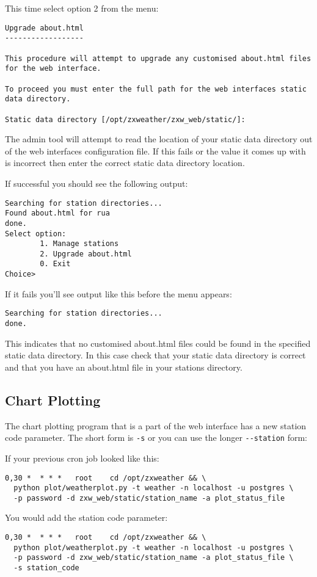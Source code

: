 \documentclass[a4paper,10pt,draft]{book}
\begin{document}
This time select option 2 from the menu:
\begin{verbatim}
Upgrade about.html
------------------

This procedure will attempt to upgrade any customised about.html files 
for the web interface.

To proceed you must enter the full path for the web interfaces static 
data directory.

Static data directory [/opt/zxweather/zxw_web/static/]:
\end{verbatim}

The admin tool will attempt to read the location of your static data directory out of the web interfaces configuration file. If this fails or the value it comes up with is incorrect then enter the correct static data directory location.

If successful you should see the following output:
\begin{verbatim}
Searching for station directories...
Found about.html for rua
done.
Select option:
        1. Manage stations
        2. Upgrade about.html
        0. Exit
Choice>
\end{verbatim}

If it fails you'll see output like this before the menu appears:
\begin{verbatim}
Searching for station directories...
done.
\end{verbatim}
This indicates that no customised about.html files could be found in the specified static data directory. In this case check that your static data directory is correct and that you have an about.html file in your stations directory.

\subsection{Chart Plotting}
The chart plotting program that is a part of the web interface has a new station code parameter. The short form is \verb|-s| or you can use the longer \verb|--station| form:

If your previous cron job looked like this:
\begin{verbatim}
0,30 *  * * *   root    cd /opt/zxweather && \
  python plot/weatherplot.py -t weather -n localhost -u postgres \
  -p password -d zxw_web/static/station_name -a plot_status_file
\end{verbatim}

You would add the station code parameter:
\begin{verbatim}
0,30 *  * * *   root    cd /opt/zxweather && \
  python plot/weatherplot.py -t weather -n localhost -u postgres \
  -p password -d zxw_web/static/station_name -a plot_status_file \
  -s station_code
\end{verbatim}
\end{document}
